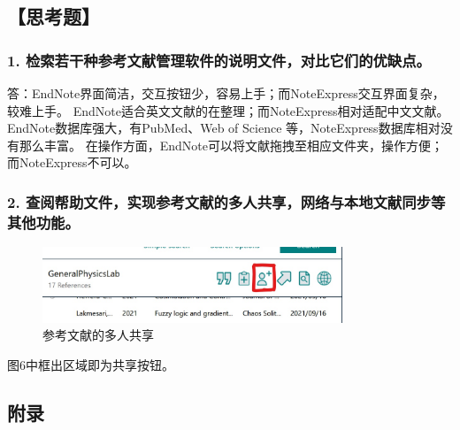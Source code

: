 \documentclass[12pt,a4paper,UTF8]{ctexart}
\begin{document}
\subsection*{【思考题】}

	\subsubsection*{1. 检索若干种参考文献管理软件的说明文件，对比它们的优缺点。}
	答：EndNote界面简洁，交互按钮少，容易上手；而NoteExpress交互界面复杂，较难上手。
	EndNote适合英文文献的在整理；而NoteExpress相对适配中文文献。
	EndNote数据库强大，有PubMed、Web of Science 等，NoteExpress数据库相对没有那么丰富。
	在操作方面，EndNote可以将文献拖拽至相应文件夹，操作方便；而NoteExpress不可以。

	\subsubsection*{2. 查阅帮助文件，实现参考文献的多人共享，网络与本地文献同步等其他功能。}
	
	\begin{figure}[htbp]
		\centering
		\includegraphics[width=0.8\textwidth]{img//share.jpg}
		\caption{参考文献的多人共享}
	\end{figure}


	
	图6中框出区域即为共享按钮。

	\newpage
	\subsection*{附录}
\end{document}
